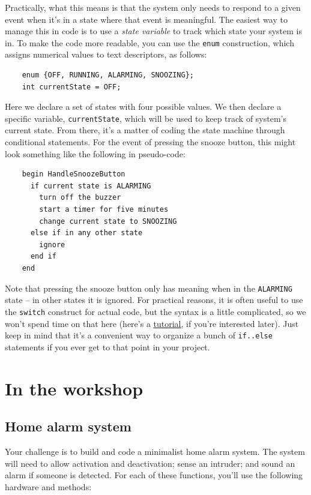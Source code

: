 \documentclass[11pt]{article} %
\begin{document}
Practically, what this means is that the system only needs to respond to a given event when it's in a state where that event is meaningful. The easiest way to manage this in code is to use a \emph{state variable} to track which state your system is in. To make the code more readable, you can use the \verb|enum| construction, which assigns numerical values to text descriptors, as follows:

\begin{verbatim}
    enum {OFF, RUNNING, ALARMING, SNOOZING};
    int currentState = OFF;
\end{verbatim}

Here we declare a set of states with four possible values. We then declare a specific variable, \verb|currentState|, which will be used to keep track of system’s current state. From there, it’s a matter of coding the state machine through conditional statements. For the event of pressing the snooze button, this might look something like the following in pseudo-code:

\begin{verbatim}
    begin HandleSnoozeButton
      if current state is ALARMING
        turn off the buzzer
        start a timer for five minutes
        change current state to SNOOZING
      else if in any other state
        ignore
      end if
    end
\end{verbatim}

Note that pressing the snooze button only has meaning when in the \verb|ALARMING| state -- in other states it is ignored. For practical reasons, it is often useful to use the \verb|switch| construct for actual code, but the syntax is a little complicated, so we won't spend time on that here (here's a \href{http://www.cplusplus.com/doc/tutorial/control/}{\underline{tutorial}}, if you're interested later). Just keep in mind that it's a convenient way to organize a bunch of \verb|if..else| statements if you ever get to that point in your project.

\section*{In the workshop}

\subsection*{Home alarm system}

Your challenge is to build and code a minimalist home alarm system. The system will need to allow activation and deactivation; sense an intruder; and sound an alarm if someone is detected. For each of these functions, you’ll use the following hardware and methods:
\end{document}
